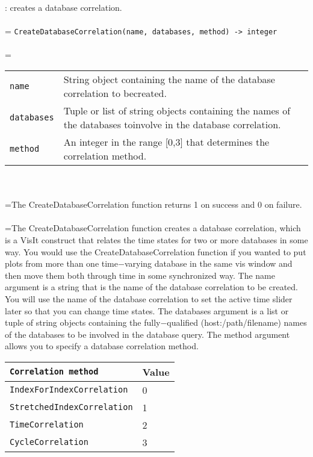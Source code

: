 \documentclass[10pt,a4paper]{report}
\begin{document}
{}
: creates a database correlation.\\[-3mm]

 \\ 
\hangindent=\parindent 
\verb!CreateDatabaseCorrelation(name, databases, method) -> integer!\\ [-3mm]

 \\ 
\hangindent=\parindent 
\begin{tabular}{lp{9cm}}
\verb!name! & String object containing the name of the database correlation to becreated. \\
\verb!databases! & Tuple or list of string objects containing the names of the databases toinvolve in the database correlation. \\
\verb!method! & An integer in the range [0,3] that determines the correlation method. \\
\end{tabular} \\[-2mm]


 \\ 
\hangindent=\parindent The CreateDatabaseCorrelation function returns 1 on success and 0 on failure. \\[-3mm] 

 \\ 
\hangindent=\parindent The CreateDatabaseCorrelation function creates a database correlation, which is a VisIt construct that relates the time states for two or more databases in some way. You would use the CreateDatabaseCorrelation function if you wanted to put plots from more than one time$-$varying database in the same vis window and then move them both through time in some synchronized way. The name argument is a string that is the name of the database correlation to be created. You will use the name of the database correlation to set the active time slider later so that you can change time states. The databases argument is a list or tuple of string objects containing the fully$-$qualified (host:/path/filename) names of the databases to be involved in the database query. The method argument allows you to specify a database correlation method. \\

\begin{tabular}{|l|l|}
\hline
\verb!Correlation method! & Value \\
\hline \hline
\verb!IndexForIndexCorrelation! & 0 \\
\verb!StretchedIndexCorrelation! & 1 \\
\verb!TimeCorrelation! & 2 \\
\verb!CycleCorrelation! & 3 \\
\hline
\end{tabular} \\[-2mm]
\\
\end{document}
